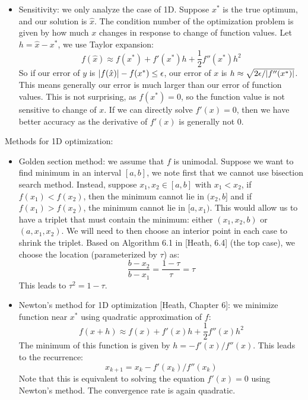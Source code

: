 \documentclass{report}
\begin{document}
\begin{itemize}
	\item Sensitivity: we only analyze the case of 1D. Suppose $x^*$ is the true optimum, and our solution is $\hat{x}$. The condition number of the optimization problem is given by how much $x$ changes in response to change of function values. Let $h = \hat{x} - x^*$, we use Taylor expansion: 
	\begin{equation}
	f(\hat{x}) \approx f(x^*) + f'(x^*) h + \frac{1}{2} f''(x^*)h^2
	\end{equation}
	So if our error of $y$ is $\lvert f(\hat{x})\rvert - f(x^*) \leq \epsilon$, our error of $x$ is $h \approx \sqrt{2 \epsilon / \lvert f''(x^*)\rvert}$. This means generally our error is much larger than our error of function values. This is not surprising, as $f(x^*) = 0$, so the function value is not sensitive to change of $x$. If we can directly solve $f'(x) = 0$, then we have better accuracy as the derivative of $f'(x)$ is generally not 0.  
\end{itemize}

Methods for 1D optimization:
\begin{itemize}
\item Golden section method: we assume that $f$ is unimodal. Suppose we want to find minimum in an interval $[a, b]$, we note first that we cannot use bisection search method. Instead, suppose $x_1, x_2 \in [a,b]$ with $x_1 < x_2$, if $f(x_1) < f(x_2)$, then the minimum cannot lie in $(x_2, b]$ and if $f(x_1) > f(x_2)$, the minimum cannot lie in $[a, x_1)$. This would allow us to have a triplet that must contain the minimum: either $(x_1, x_2, b)$ or $(a, x_1, x_2)$. We will need to then choose an interior point in each case to shrink the triplet. Based on Algorithm 6.1 in [Heath, 6.4] (the top case), we choose the location (parameterized by $\tau$) as: 
\begin{equation}
\frac{b - x_2}{b - x_1} = \frac{1 - \tau}{\tau} = \tau
\end{equation}
This leads to $\tau^2 = 1 - \tau$.   

\item Newton's method for 1D optimization [Heath, Chapter 6]: we minimize function near $x^*$ using quadratic approximation of $f$:
\begin{equation}
f(x+h) \approx f(x) + f'(x) h + \frac{1}{2} f''(x) h^2
\end{equation}
The minimum of this function is given by $h = -f'(x) / f''(x)$. This leads to the recurrence: 
\begin{equation}
x_{k+1} = x_k - f'(x_k) / f''(x_k)
\end{equation}
Note that this is equivalent to solving the equation $f'(x) = 0$ using Newton's method. The convergence rate is again quadratic. 

\end{itemize}
\end{document}
